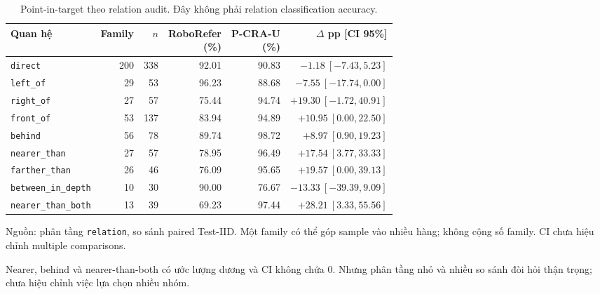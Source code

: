 \begin{table}[htbp]
    \centering
    \setlength{\tabcolsep}{4pt}
    \renewcommand{\arraystretch}{1.15}
    \caption{Point-in-target theo relation audit.
    Đây không phải relation classification accuracy.}
    \label{tab:results-relation-strata}
    \small
    \begin{tabularx}{\textwidth}{@{}>{\raggedright\arraybackslash}Xrrrrr@{}}
        \toprule
        Quan hệ & Family & $n$ & \shortstack{RoboRefer\\(\%)} & \shortstack{P-CRA-U\\(\%)} & \shortstack{$\Delta$ pp\\{[CI 95\%]}} \\
        \midrule
        \texttt{direct} & 200 & 338 & 92.01 & 90.83 & $-1.18\ [-7.43,5.23]$ \\
        \texttt{left\_\allowbreak of} & 29 & 53 & 96.23 & 88.68 & $-7.55\ [-17.74,0.00]$ \\
        \texttt{right\_\allowbreak of} & 27 & 57 & 75.44 & 94.74 & $+19.30\ [-1.72,40.91]$ \\
        \texttt{front\_\allowbreak of} & 53 & 137 & 83.94 & 94.89 & $+10.95\ [0.00,22.50]$ \\
        \texttt{behind} & 56 & 78 & 89.74 & 98.72 & $+8.97\ [0.90,19.23]$ \\
        \texttt{nearer\_\allowbreak than} & 27 & 57 & 78.95 & 96.49 & $+17.54\ [3.77,33.33]$ \\
        \texttt{farther\_\allowbreak than} & 26 & 46 & 76.09 & 95.65 & $+19.57\ [0.00,39.13]$ \\
        \texttt{between\_\allowbreak in\_\allowbreak depth} & 10 & 30 & 90.00 & 76.67 & $-13.33\ [-39.39,9.09]$ \\
        \texttt{nearer\_\allowbreak than\_\allowbreak both} & 13 & 39 & 69.23 & 97.44 & $+28.21\ [3.33,55.56]$ \\
        \bottomrule
    \end{tabularx}
    \vspace{2pt}
    {\footnotesize\raggedright Nguồn: phân tầng \texttt{relation},
    so sánh paired Test-IID. Một family có thể góp
    sample vào nhiều hàng; không cộng số family.
    CI chưa hiệu chỉnh multiple comparisons.\par}
\end{table}

Nearer, behind và nearer-than-both có
ước lượng dương và CI không chứa 0.
Nhưng phân tầng nhỏ và nhiều so sánh
đòi hỏi thận trọng; chưa hiệu chỉnh
việc lựa chọn nhiều nhóm.

